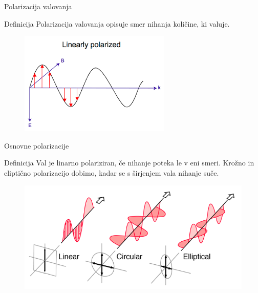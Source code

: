\documentclass{beamer}
\begin{document}
\begin{frame}{Polarizacija valovanja}

\begin{block}{Definicija}
Polarizacija valovanja opisuje smer nihanja količine, ki valuje.
\end{block}

\begin{figure}
\centering
\includegraphics[scale=0.75]{images}
\end{figure}

\end{frame}


\begin{frame}{Osnovne polarizacije}

\begin{block}{Definicija}
Val je linarno polariziran, če nihanje poteka le v eni smeri. Krožno in eliptično polarizacijo dobimo, kadar se s širjenjem vala nihanje suče.
\end{block}

\begin{figure}
\centering
\includegraphics[scale=2]{polcls}
\end{figure}

\end{frame}

\end{document}
